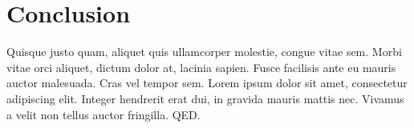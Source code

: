 \section{Conclusion}%
\label{sec:conclusion}
Quisque justo quam, aliquet quis ullamcorper molestie, congue vitae sem. Morbi vitae orci aliquet, dictum dolor at, lacinia sapien. Fusce facilisis ante eu mauris auctor malesuada. Cras vel tempor sem. Lorem ipsum dolor sit amet, consectetur adipiscing elit. Integer hendrerit erat dui, in gravida mauris mattis nec. Vivamus a velit non tellus auctor fringilla. QED.